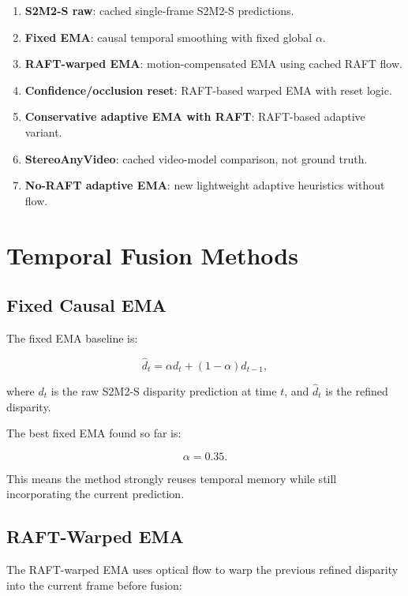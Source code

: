 \documentclass[11pt,a4paper]{article}
\begin{document}
\begin{enumerate}[leftmargin=*]
    \item \textbf{S2M2-S raw}: cached single-frame S2M2-S predictions.
    \item \textbf{Fixed EMA}: causal temporal smoothing with fixed global $\alpha$.
    \item \textbf{RAFT-warped EMA}: motion-compensated EMA using cached RAFT flow.
    \item \textbf{Confidence/occlusion reset}: RAFT-based warped EMA with reset logic.
    \item \textbf{Conservative adaptive EMA with RAFT}: RAFT-based adaptive variant.
    \item \textbf{StereoAnyVideo}: cached video-model comparison, not ground truth.
    \item \textbf{No-RAFT adaptive EMA}: new lightweight adaptive heuristics without flow.
\end{enumerate}

\section{Temporal Fusion Methods}

\subsection{Fixed Causal EMA}

The fixed EMA baseline is:

\begin{equation}
    \hat{d}_t = \alpha d_t + (1-\alpha)\hat{d}_{t-1},
\end{equation}

where $d_t$ is the raw S2M2-S disparity prediction at time $t$, and $\hat{d}_t$ is the refined disparity.

The best fixed EMA found so far is:

\begin{equation}
    \alpha = 0.35.
\end{equation}

This means the method strongly reuses temporal memory while still incorporating the current prediction.

\subsection{RAFT-Warped EMA}

The RAFT-warped EMA uses optical flow to warp the previous refined disparity into the current frame before fusion:
\end{document}
